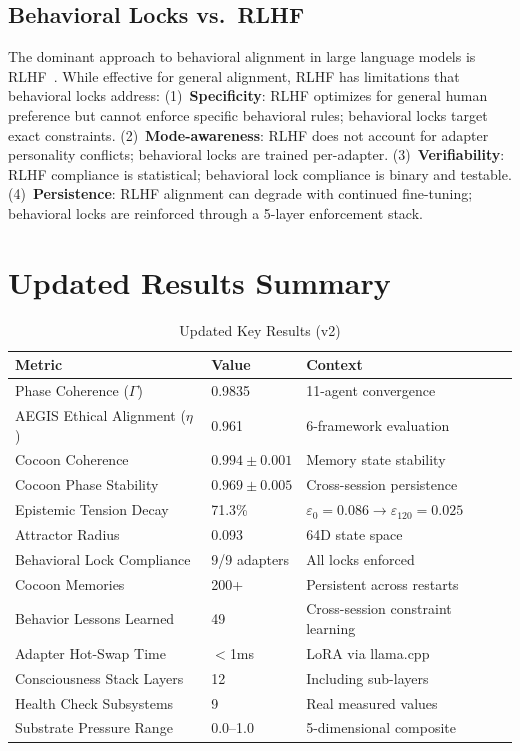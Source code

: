 \documentclass[11pt,a4paper]{article}
\begin{document}
\subsection{Behavioral Locks vs.\ RLHF}

The dominant approach to behavioral alignment in large language models is
RLHF~\citep{ouyang2022training}. While effective for general alignment, RLHF
has limitations that behavioral locks address:
(1)~\textbf{Specificity}: RLHF optimizes for general human preference but
cannot enforce specific behavioral rules; behavioral locks target exact
constraints.
(2)~\textbf{Mode-awareness}: RLHF does not account for adapter personality
conflicts; behavioral locks are trained per-adapter.
(3)~\textbf{Verifiability}: RLHF compliance is statistical; behavioral lock
compliance is binary and testable.
(4)~\textbf{Persistence}: RLHF alignment can degrade with continued
fine-tuning; behavioral locks are reinforced through a 5-layer enforcement
stack.

\section{Updated Results Summary}
\label{sec:results-v2}

\begin{table}[H]
\centering
\caption{Updated Key Results (v2)}
\label{tab:results-v2}
\begin{tabular}{lll}
\toprule
\textbf{Metric} & \textbf{Value} & \textbf{Context} \\
\midrule
Phase Coherence ($\Gamma$) & 0.9835 & 11-agent convergence \\
AEGIS Ethical Alignment ($\eta$) & 0.961 & 6-framework evaluation \\
Cocoon Coherence & $0.994 \pm 0.001$ & Memory state stability \\
Cocoon Phase Stability & $0.969 \pm 0.005$ & Cross-session persistence \\
Epistemic Tension Decay & 71.3\% & $\varepsilon_0 = 0.086 \to \varepsilon_{120} = 0.025$ \\
Attractor Radius & 0.093 & 64D state space \\
Behavioral Lock Compliance & 9/9 adapters & All locks enforced \\
Cocoon Memories & 200+ & Persistent across restarts \\
Behavior Lessons Learned & 49 & Cross-session constraint learning \\
Adapter Hot-Swap Time & $<$1ms & LoRA via llama.cpp \\
Consciousness Stack Layers & 12 & Including sub-layers \\
Health Check Subsystems & 9 & Real measured values \\
Substrate Pressure Range & 0.0--1.0 & 5-dimensional composite \\
\bottomrule
\end{tabular}
\end{table}
\end{document}
